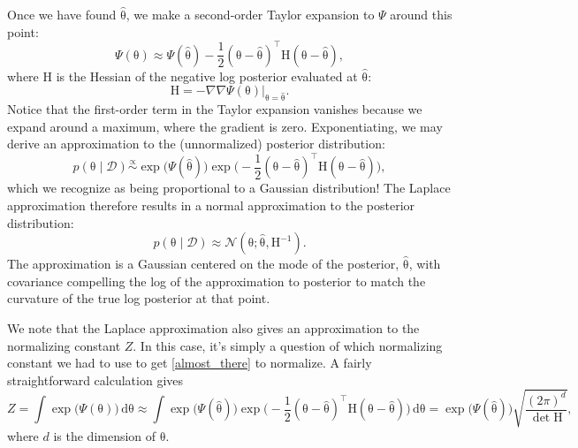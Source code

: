 \documentclass{article}
\newcommand{\given}{\mid}
\newcommand{\mc}[1]{\mathcal{#1}}
\newcommand{\data}{\mc{D}}
\newcommand{\intd}[1]{\,\mathrm{d}{#1}}
\newcommand{\inv}{^{-1}}
\newcommand{\trans}{^\top}
\newcommand{\mat}[1]{\bm{\mathrm{#1}}}
\renewcommand{\vec}[1]{\bm{\mathrm{#1}}}
\begin{document}
Once we have found $\hat{\vec{\theta}}$, we make a second-order Taylor
expansion to $\Psi$ around this point:
\begin{equation*}
  \Psi(\vec{\theta})
  \approx
  \Psi(\hat{\vec{\theta}})
  -
  \frac{1}{2}
  (\vec{\theta} - \hat{\vec{\theta}})\trans
  \mat{H}
  (\vec{\theta} - \hat{\vec{\theta}}),
\end{equation*}
where $\mat{H}$ is the Hessian of the negative log posterior evaluated
at $\hat{\vec{\theta}}$:
\begin{equation*}
  \mat{H}
  =
  -\nabla\nabla \Psi(\vec{\theta}) \bigr\rvert_{\vec{\theta} = \hat{\vec{\theta}}}.
\end{equation*}
Notice that the first-order term in the Taylor expansion vanishes
because we expand around a maximum, where the gradient is zero.
Exponentiating, we may derive an approximation to the (unnormalized)
posterior distribution:
\begin{equation}
  \label{almost_there}
  p(\vec{\theta} \given \data)
  \overset{\propto}{\sim}
  \exp\bigl(\Psi(\hat{\vec{\theta}})\bigr)
  \exp\biggl(-\frac{1}{2}
  (\vec{\theta} - \hat{\vec{\theta}})\trans
  \mat{H}
  (\vec{\theta} - \hat{\vec{\theta}})
  \biggr),
\end{equation}
which we recognize as being proportional to a Gaussian distribution!
The Laplace approximation therefore results in a normal approximation
to the posterior distribution:
\begin{equation*}
  p(\vec{\theta} \given \data)
  \approx
  \mc{N}(\vec{\theta}; \hat{\vec{\theta}}, \mat{H}\inv).
\end{equation*}
The approximation is a Gaussian centered on the mode of the posterior,
$\hat{\vec{\theta}}$, with covariance compelling the log of the
approximation to posterior to match the curvature of the true log
posterior at that point.

We note that the Laplace approximation also gives an approximation to
the normalizing constant $Z$.  In this case, it's simply a question of
which normalizing constant we had to use to get \eqref{almost_there}
to normalize.  A fairly straightforward calculation gives
\begin{equation*}
  Z
  =
  \int \exp\bigl(\Psi(\vec{\theta})\bigr) \intd{\vec{\theta}}
  \approx
  \int
  \exp\bigl(\Psi(\hat{\vec{\theta}})\bigr)
  \exp\biggl(-\frac{1}{2}
  (\vec{\theta} - \hat{\vec{\theta}})\trans
  \mat{H}
  (\vec{\theta} - \hat{\vec{\theta}})
  \biggr)
  \intd{\vec{\theta}}
  =
  \exp\bigl(\Psi(\hat{\vec{\theta}})\bigr)
  \sqrt{
    \frac{(2\pi)^d}
         {\det \mat{H}}
   },
\end{equation*}
where $d$ is the dimension of $\vec{\theta}$.
\end{document}

